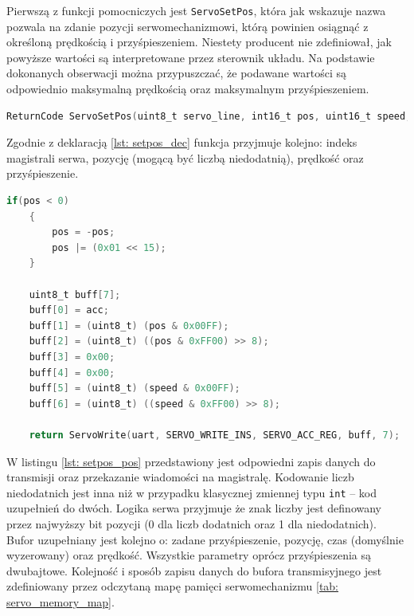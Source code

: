 Pierwszą z funkcji pomocniczych jest \texttt{ServoSetPos}, która jak wskazuje nazwa pozwala na zdanie pozycji serwomechanizmowi, którą powinien osiągnąć z określoną prędkością i przyśpieszeniem. Niestety producent nie zdefiniował, jak powyższe wartości są interpretowane przez sterownik układu. Na podstawie dokonanych obserwacji można przypuszczać, że podawane wartości są odpowiednio maksymalną prędkością oraz maksymalnym przyśpieszeniem. 
\begin{lstlisting}[language=C,
    caption={Deklaracja funkcji \texttt{ServoSetPos}}
    label={lst: setpos_dec}]
    ReturnCode ServoSetPos(uint8_t servo_line, int16_t pos, uint16_t speed, uint8_t acc)
\end{lstlisting}
Zgodnie z deklaracją \ref{lst: setpos_dec} funkcja przyjmuje kolejno: indeks magistrali serwa, pozycję (mogącą być liczbą niedodatnią), prędkość oraz przyśpieszenie.
\begin{lstlisting}[language=C,
caption={Fragment kodu odpowiadający za zapis nowej pozycji do pamięci serwa},
label={lst: setpos_pos}]
    if(pos < 0)
    {
        pos = -pos;
        pos |= (0x01 << 15);
    }
    
    uint8_t buff[7];
    buff[0] = acc;
    buff[1] = (uint8_t) (pos & 0x00FF);
    buff[2] = (uint8_t) ((pos & 0xFF00) >> 8);
    buff[3] = 0x00;
    buff[4] = 0x00;
    buff[5] = (uint8_t) (speed & 0x00FF);
    buff[6] = (uint8_t) ((speed & 0xFF00) >> 8);
    
    return ServoWrite(uart, SERVO_WRITE_INS, SERVO_ACC_REG, buff, 7);
\end{lstlisting}
W listingu \ref{lst: setpos_pos} przedstawiony jest odpowiedni zapis danych do transmisji oraz przekazanie wiadomości na magistralę. Kodowanie liczb niedodatnich jest inna niż w przypadku klasycznej zmiennej typu \texttt{int} -- kod uzupełnień do dwóch. Logika serwa przyjmuje że znak liczby jest definowany przez najwyższy bit pozycji (0 dla liczb dodatnich oraz 1 dla niedodatnich). Bufor uzupełniany jest kolejno o: zadane przyśpieszenie, pozycję, czas (domyślnie wyzerowany) oraz prędkość. Wszystkie parametry oprócz przyśpieszenia są dwubajtowe. Kolejność i sposób zapisu danych do bufora transmisyjnego jest zdefiniowany przez odczytaną mapę pamięci serwomechanizmu \ref{tab: servo_memory_map}. 

